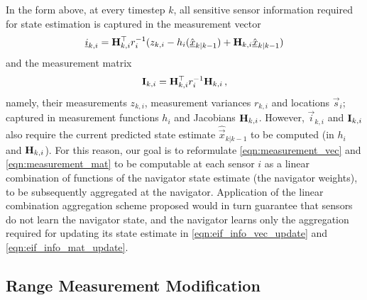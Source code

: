 \documentclass[10pt,letterpaper,oneside,twocolumn,journal]{IEEEtran}
\theoremstyle{definition}
\theoremstyle{definition}
\theoremstyle{remark}
\begin{document}
In the form above, at every timestep $k$, all sensitive sensor information required for state estimation is captured in the measurement vector
\begin{equation}
    \vec{i}_{k,i} = \mat{H}^\top_{k,i} r^{-1}_i (z_{k,i} - h_i(\hat{\vec{x}}_{k|k-1}) + \mat{H}_{k,i}\hat{\vec{x}}_{k|k-1}) \label{eqn:measurement_vec}
\end{equation}
and the measurement matrix
\begin{equation}
    \mat{I}_{k,i} = \mat{H}^\top_{k,i} r^{-1}_i \mat{H}_{k,i}\,, \label{eqn:measurement_mat}
\end{equation}
namely, their measurements $z_{k,i}$, measurement variances $r_{k,i}$ and locations $\vec{s}_i$; captured in measurement functions $h_i$ and Jacobians ${{\mathbf{H}}}_{k,i}$. However, $\vec{i}_{k,i}$ and ${{\mathbf{I}}}_{k,i}$ also require the current predicted state estimate $\hat{\vec{x}}_{k|k-1}$ to be computed (in $h_i$ and ${{\mathbf{H}}}_{k,i}$). For this reason, our goal is to reformulate \eqref{eqn:measurement_vec} and \eqref{eqn:measurement_mat} to be computable at each sensor $i$ as a linear combination of functions of the navigator state estimate (the navigator weights), to be subsequently aggregated at the navigator. Application of the linear combination aggregation scheme proposed would in turn guarantee that sensors do not learn the navigator state, and the navigator learns only the aggregation required for updating its state estimate in \eqref{eqn:eif_info_vec_update} and \eqref{eqn:eif_info_mat_update}.

% 
% 

\subsection{Range Measurement Modification} \label{subsec:range_measurement_mod}
\end{document}
